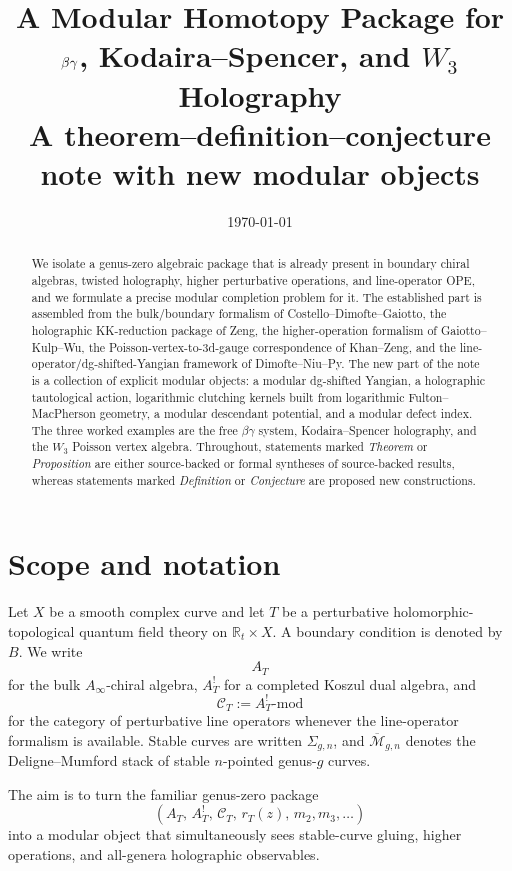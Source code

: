 \documentclass[11pt]{article}
\title{\vspace{-1em}\textbf{A Modular Homotopy Package for $\bbeta\bgamma$, Kodaira--Spencer, and $W_3$ Holography}\\[0.45em]
\large A theorem--definition--conjecture note with new modular objects}
\author{}
\date{\today}
\theoremstyle{definition}
\theoremstyle{remark}
\newcommand{\C}{\mathcal C}
\newcommand{\M}{\mathcal M}
\newcommand{\bbeta}{\beta}
\newcommand{\bgamma}{\gamma}
\begin{document}
\maketitle

\begin{abstract}
We isolate a genus-zero algebraic package that is already present in boundary chiral algebras, twisted holography, higher perturbative operations, and line-operator OPE, and we formulate a precise modular completion problem for it. The established part is assembled from the bulk/boundary formalism of Costello--Dimofte--Gaiotto, the holographic KK-reduction package of Zeng, the higher-operation formalism of Gaiotto--Kulp--Wu, the Poisson-vertex-to-3d-gauge correspondence of Khan--Zeng, and the line-operator/dg-shifted-Yangian framework of Dimofte--Niu--Py. The new part of the note is a collection of explicit modular objects: a modular dg-shifted Yangian, a holographic tautological action, logarithmic clutching kernels built from logarithmic Fulton--MacPherson geometry, a modular descendant potential, and a modular defect index. The three worked examples are the free $\bbeta\bgamma$ system, Kodaira--Spencer holography, and the $W_3$ Poisson vertex algebra. Throughout, statements marked \emph{Theorem} or \emph{Proposition} are either source-backed or formal syntheses of source-backed results, whereas statements marked \emph{Definition} or \emph{Conjecture} are proposed new constructions.
\end{abstract}

\tableofcontents

\section{Scope and notation}

Let $X$ be a smooth complex curve and let $T$ be a perturbative holomorphic-topological quantum field theory on $\mathbb R_t \times X$. A boundary condition is denoted by $B$. We write
\[
A_T
\]
for the bulk $A_\infty$-chiral algebra, $A_T^!$ for a completed Koszul dual algebra, and
\[
\C_T := A_T^!\text{-mod}
\]
for the category of perturbative line operators whenever the line-operator formalism is available. Stable curves are written $\Sigma_{g,n}$, and $\overline{\M}_{g,n}$ denotes the Deligne--Mumford stack of stable $n$-pointed genus-$g$ curves.

The aim is to turn the familiar genus-zero package
\[
(A_T,\,A_T^!,\,\C_T,\,r_T(z),\,m_2,m_3,\dots)
\]
into a modular object that simultaneously sees stable-curve gluing, higher operations, and all-genera holographic observables.
\end{document}
